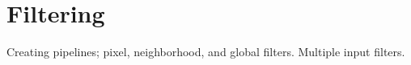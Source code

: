 \chapter{Filtering}

Creating pipelines; pixel, neighborhood, and global filters. Multiple input filters.







